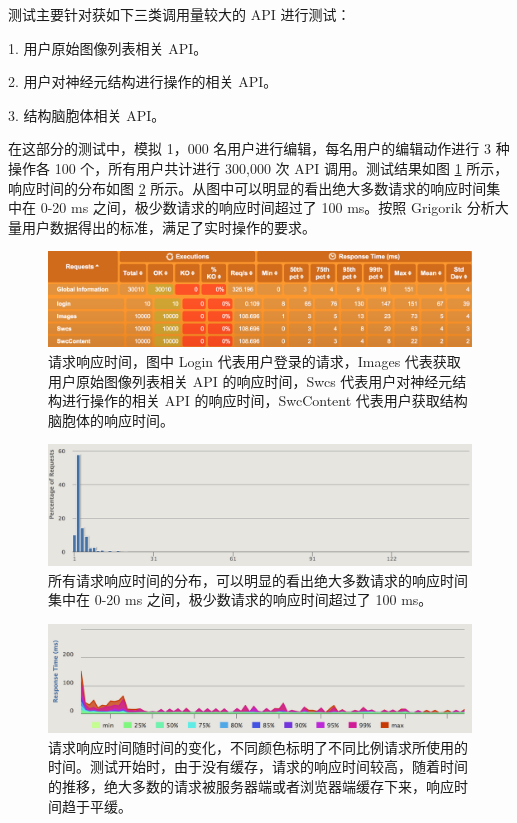 测试主要针对获如下三类调用量较大的 API 进行测试：

1. 用户原始图像列表相关 API。

2. 用户对神经元结构进行操作的相关 API。

3. 结构脑胞体相关 API。

在这部分的测试中，模拟 1，000 名用户进行编辑，每名用户的编辑动作进行 3 种操作各 100 个，所有用户共计进行 300,000 次 API 调用。测试结果如图 \ref{response} 所示，响应时间的分布如图 \ref{responsedis} 所示。从图中可以明显的看出绝大多数请求的响应时间集中在 0-20 ms 之间，极少数请求的响应时间超过了 100 ms。按照 Grigorik 分析大量用户数据得出的标准，满足了实时操作的要求。

\begin{figure}[!ht]
\centering
\includegraphics[width=148mm]{images/response}
\caption{请求响应时间，图中 Login 代表用户登录的请求，Images 代表获取用户原始图像列表相关 API 的响应时间，Swcs 代表用户对神经元结构进行操作的相关 API 的响应时间，SwcContent 代表用户获取结构脑胞体的响应时间。}
\label{response}
\end{figure}

\begin{figure}[!ht]
\centering
\includegraphics[width=148mm]{images/responsedis}
\caption{所有请求响应时间的分布，可以明显的看出绝大多数请求的响应时间集中在 0-20 ms 之间，极少数请求的响应时间超过了 100 ms。}
\label{responsedis}
\end{figure}

\begin{figure}[!ht]
\centering
\includegraphics[width=148mm]{images/responsetime}
\caption{请求响应时间随时间的变化，不同颜色标明了不同比例请求所使用的时间。测试开始时，由于没有缓存，请求的响应时间较高，随着时间的推移，绝大多数的请求被服务器端或者浏览器端缓存下来，响应时间趋于平缓。}
\label{responsetime}
\end{figure}

